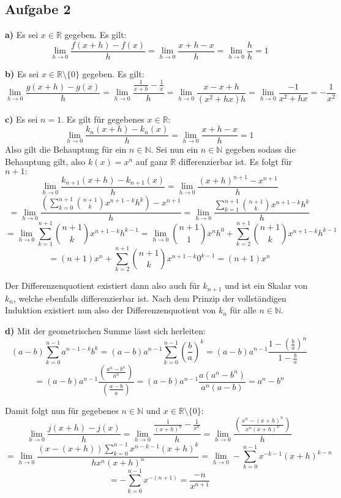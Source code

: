 \documentclass[a4paper,graphics,11pt]{article}
\newcommand{\aufgabe}[1]{\subsection*{Aufgabe #1}}
\begin{document}
\aufgabe{2}
\textbf{a)}
Es sei $x \in \mathbb{R}$ gegeben. Es gilt:
$$
    \lim_{h \to 0} \frac{f(x+h)-f(x)}{h}
    = \lim_{h \to 0} \frac{x+h-x}{h}
    = \lim_{h \to 0} \frac{h}{h} = 1
$$

\textbf{b)}
Es sei $x \in \mathbb{R}\setminus \{0\}$ gegeben. Es gilt:
$$
    \lim_{h \to 0} \frac{g(x+h)-g(x)}{h}
    = \lim_{h \to 0} \frac{\frac{1}{x+h} - \frac{1}{x}}{h}
    = \lim_{h \to 0} \frac{x-x+h}{(x^2+hx)h}
    = \lim_{h \to 0} \frac{-1}{x^2+hx}
    = -\frac{1}{x^2}
$$
\newpage

\textbf{c)}
Es sei $n=1$. Es gilt für gegebenes $x \in \mathbb{R}\colon$
$$
    \lim_{h \to 0} \frac{k_n(x+h)-k_n(x)}{h}
    = \lim_{h \to 0} \frac{x+h-x}{h}
    = 1
$$
Also gilt die Behauptung für ein $n \in \mathbb{N}$.
Sei nun ein $n \in \mathbb{N}$ gegeben sodass die Behauptung gilt, also $k(x) = x^n$ auf ganz $\mathbb{R}$
differenzierbar ist. Es folgt für $n+1\colon$
$$
    \lim_{h \to 0} \frac{k_{n+1}(x+h)-k_{n+1}(x)}{h}
    = \lim_{h \to 0} \frac{(x+h)^{n+1}-x^{n+1}}{h}
$$$$
    = \lim_{h \to 0} \frac{\displaystyle\left(\sum_{k=0}^{n+1}\binom{n+1}{k}x^{n+1-k}h^k\right)-x^{n+1}}{h}
    = \lim_{h \to 0} \frac{\displaystyle\sum_{k=1}^{n+1}\binom{n+1}{k}x^{n+1-k}h^k}{h}
$$$$
    = \lim_{h \to 0} \sum_{k=1}^{n+1}\binom{n+1}{k}x^{n+1-k}h^{k-1}
    = \lim_{h \to 0} \binom{n+1}{1}x^{n}h^0+\sum_{k=2}^{n+1} \binom{n+1}{k}x^{n+1-k}h^{k-1}
$$$$
    = (n+1)x^n + \sum_{k=2}^{n+1} \binom{n+1}{k}x^{n+1-k}0^{k-1}
    = (n+1)x^n
$$

Der Differenzenquotient existiert dann also auch für $k_{n+1}$ und ist ein Skalar von $k_n$, welche
ebenfalls differenzierbar ist.
Nach dem Prinzip der vollständigen Induktion existiert nun also der Differenzenquotient von $k_n$ für
alle $n \in \mathbb{N}$.

\textbf{d)}
Mit der geometrischen Summe lässt sich herleiten:
$$
    (a-b)\sum_{k=0}^{n-1} a^{n-1-k}b^k
    = (a-b)a^{n-1}\sum_{k=0}^{n-1} \left(\frac{b}{a}\right)^k
    = (a-b)a^{n-1}\frac{1-\left(\frac{b}{a}\right)^n}{1-\frac{b}{a}}
$$$$
    = (a-b)a^{n-1} \frac{\left(\frac{a^n-b^n}{a^n}\right)}{\left(\frac{a-b}{a}\right)}
    = (a-b)a^{n-1} \frac{a(a^n-b^n)}{a^n(a-b)} = a^n-b^n
$$

Damit folgt nun für gegebenes $n \in \mathbb{N}$ und $x \in \mathbb{R}\setminus \{0\}\colon$
$$
    \lim_{h \to 0} \frac{j(x+h)-j(x)}{h}
    = \lim_{h \to 0} \frac{\frac{1}{(x+h)^n} - \frac{1}{x^n}}{h}
    = \lim_{h \to 0} \frac{\left(\frac{x^n-(x+h)^n}{x^n(x+h)^n}\right)}{h}
$$$$
    = \lim_{h \to 0} \frac{(x-(x+h))\sum_{k=0}^{n-1} x^{n-k-1}(x+h)^k}{hx^n(x+h)^n} 
    = \lim_{h \to 0} -\sum_{k=0}^{n-1} x^{-k-1}(x+h)^{k-n}
$$$$
    = -\sum_{k=0}^{n-1} x^{-(n+1)} = \frac{-n}{x^{n+1}}
$$
\end{document}
